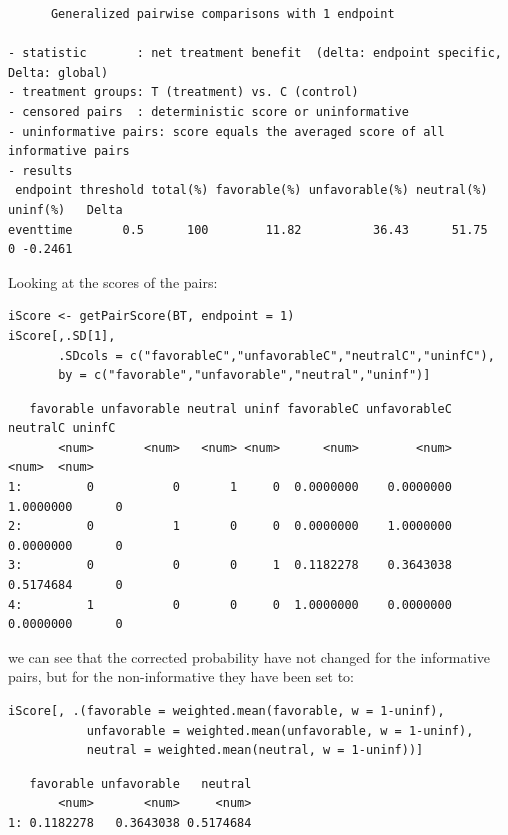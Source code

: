 \documentclass[12pt]{article}
\begin{document}
\begin{verbatim}
      Generalized pairwise comparisons with 1 endpoint

- statistic       : net treatment benefit  (delta: endpoint specific, Delta: global) 
- treatment groups: T (treatment) vs. C (control) 
- censored pairs  : deterministic score or uninformative
- uninformative pairs: score equals the averaged score of all informative pairs
- results
 endpoint threshold total(%) favorable(%) unfavorable(%) neutral(%) uninf(%)   Delta
eventtime       0.5      100        11.82          36.43      51.75        0 -0.2461
\end{verbatim}



Looking at the scores of the pairs:
\lstset{language=r,label= ,caption= ,captionpos=b,numbers=none}
\begin{lstlisting}
iScore <- getPairScore(BT, endpoint = 1)
iScore[,.SD[1], 
       .SDcols = c("favorableC","unfavorableC","neutralC","uninfC"),
       by = c("favorable","unfavorable","neutral","uninf")]
\end{lstlisting}

\begin{verbatim}
   favorable unfavorable neutral uninf favorableC unfavorableC  neutralC uninfC
       <num>       <num>   <num> <num>      <num>        <num>     <num>  <num>
1:         0           0       1     0  0.0000000    0.0000000 1.0000000      0
2:         0           1       0     0  0.0000000    1.0000000 0.0000000      0
3:         0           0       0     1  0.1182278    0.3643038 0.5174684      0
4:         1           0       0     0  1.0000000    0.0000000 0.0000000      0
\end{verbatim}


we can see that the corrected probability have not changed for the
informative pairs, but for the non-informative they have been set to:
\lstset{language=r,label= ,caption= ,captionpos=b,numbers=none}
\begin{lstlisting}
iScore[, .(favorable = weighted.mean(favorable, w = 1-uninf), 
           unfavorable = weighted.mean(unfavorable, w = 1-uninf), 
           neutral = weighted.mean(neutral, w = 1-uninf))]
\end{lstlisting}

\begin{verbatim}
   favorable unfavorable   neutral
       <num>       <num>     <num>
1: 0.1182278   0.3643038 0.5174684
\end{verbatim}
\end{document}
